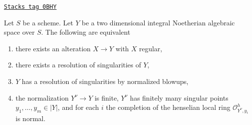 \begin{theorem}[Resolve]
\label{spaces-resolve-theorem-resolve}
\href{https://stacks.math.columbia.edu/tag/0BHY}{\texttt{Stacks tag 0BHY}}

Let $S$ be a scheme. Let $Y$ be a two dimensional integral
Noetherian algebraic space over $S$. The following are equivalent
\begin{enumerate}
\item there exists an alteration $X \to Y$ with $X$ regular,
\item there exists a resolution of singularities of $Y$,
\item $Y$ has a resolution of singularities by normalized blowups,
\item the normalization $Y^\nu \to Y$ is finite, $Y^\nu$ has
finitely many singular points $y_1, \ldots, y_m \in |Y|$, and
for each $i$ the completion of the henselian local ring
$\mathcal{O}_{Y^\nu, y_i}^h$ is normal.
\end{enumerate}
\end{theorem}

